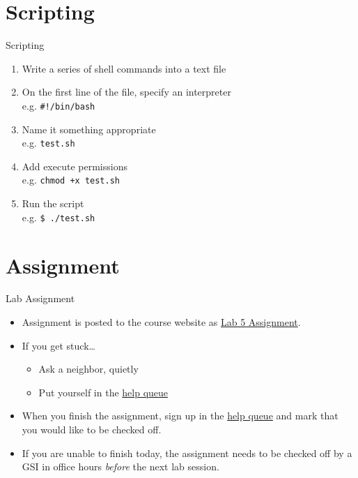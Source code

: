\documentclass[table,dvipsnames]{beamer}
\begin{document}
\section{Scripting}

\begin{frame}{Scripting}
	\begin{enumerate}
		\item Write a series of shell commands into a text file
		\item On the first line of the file, specify an interpreter \\
			e.g. \texttt{\#!/bin/bash}
		\item Name it something appropriate \\
			e.g. \texttt{test.sh}
		\item Add execute permissions \\
			e.g. \texttt{chmod +x test.sh}
		\item Run the script \\
			e.g. \texttt{\$ ./test.sh}
	\end{enumerate}
\end{frame}

\section{Assignment}
\begin{frame}[fragile]{Lab Assignment}
	\begin{itemize}
		\item Assignment is posted to the course website as 
			\href{http://www.eecs.umich.edu/eecs/courses/eecs470/labs/eecs470lab5assignment.pdf}{Lab
			5 Assignment}.
		\item If you get stuck\dots
			\begin{itemize}
				\item Ask a neighbor, quietly
				\item Put yourself in the 
					\href{https://oh.eecs.umich.edu/course_queues/403}{help queue}
			\end{itemize}
		\item When you finish the assignment, sign up in the
			\href{https://oh.eecs.umich.edu/course_queues/403}{help queue}
			and mark that you would like to be checked off.
		\item If you are unable to finish today, the assignment needs to be
			checked off by a GSI in office hours \emph{before} the next lab
			session.
	\end{itemize}
\end{frame}
\end{document}
